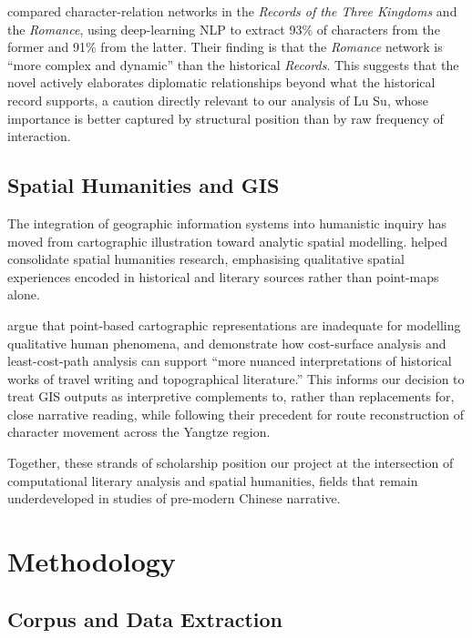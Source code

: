 \documentclass[12pt, a4paper]{article}
\newcommand{\booktitle}[1]{\textit{#1}}
\begin{document}
\textcite{zhang2021complicating} compared character-relation networks in the
\booktitle{Records of the Three Kingdoms} and the \booktitle{Romance},
using deep-learning NLP to extract 93\% of characters from the former
and 91\% from the latter.
Their finding is that the \booktitle{Romance} network is ``more complex and
dynamic'' than the historical \booktitle{Records}. This suggests that the novel
actively elaborates diplomatic relationships beyond what the historical record
supports, a caution directly relevant to our analysis of Lu Su, whose
importance is better captured by structural position than by raw frequency of
interaction. 

\subsection{Spatial Humanities and GIS}

The integration of geographic information systems into humanistic inquiry
has moved from cartographic illustration toward analytic spatial modelling.
\textcite{gregory2014toward} helped consolidate spatial humanities research,
emphasising qualitative spatial experiences encoded in historical and literary
sources rather than point-maps alone.

\textcite{murrieta2017gis} argue that point-based cartographic representations
are inadequate for modelling qualitative human phenomena, and demonstrate how
cost-surface analysis and least-cost-path analysis can support ``more nuanced
interpretations of historical works of travel writing and topographical
literature.''
This informs our decision to treat GIS outputs as interpretive complements to,
rather than replacements for, close narrative reading, while following their
precedent for route reconstruction of character movement across the Yangtze
region.

Together, these strands of scholarship position our project at the intersection of computational literary analysis and spatial humanities, fields that remain underdeveloped in studies of pre-modern Chinese narrative. 

\section{Methodology}
\label{sec:methodology}

\subsection{Corpus and Data Extraction}
\label{sec:data_extraction}
\end{document}
